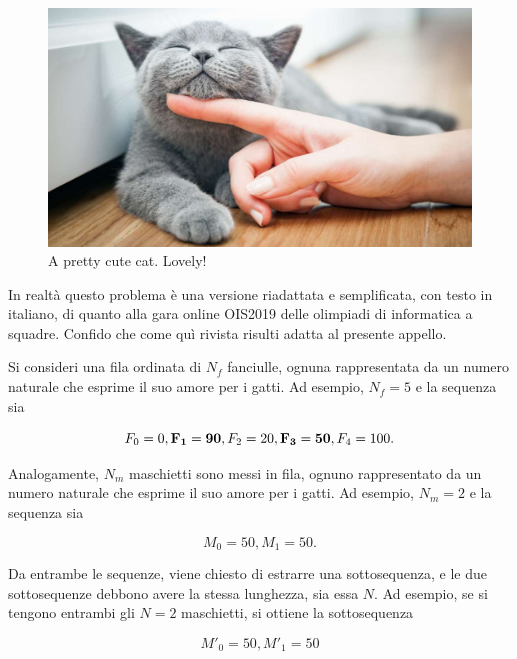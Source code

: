 \usepackage{xcolor}
\usepackage{afterpage}
\usepackage{pifont,mdframed}
\usepackage[bottom]{footmisc}

\makeatletter
\gdef\this@inputfilename{input}
\gdef\this@outputfilename{output}
\makeatother

\begin{figure}
  \vspace{-25pt}
  \begin{center}
        \includegraphics[width=0.9\linewidth]{cats.jpg}
  \end{center}
  \vspace{-20pt}
  \caption{A pretty cute cat. Lovely!}
\end{figure}

In realtà questo problema è una versione riadattata e semplificata, con testo in italiano, di quanto alla gara online OIS2019 delle olimpiadi di informatica a squadre. Confido che come quì rivista risulti adatta al presente appello.

Si consideri una fila ordinata di $N_f$ fanciulle, ognuna rappresentata da un numero naturale che esprime il suo amore per i gatti. Ad esempio, $N_f = 5$
e la sequenza sia

\[
   F_0 = 0, {\bf F_1 = 90}, F_2 = 20, {\bf F_3 = 50}, F_4=100.
\]

Analogamente, $N_m$ maschietti sono messi in fila, ognuno rappresentato da un numero naturale che esprime il suo amore per i gatti. Ad esempio, $N_m = 2$
e la sequenza sia

\[
   M_0 = 50, M_1=50.
\]

Da entrambe le sequenze, viene chiesto di estrarre una sottosequenza, e le due sottosequenze debbono avere la stessa lunghezza, sia essa $N$.
Ad esempio, se si tengono entrambi gli $N=2$ maschietti,
si ottiene la sottosequenza

\[
   M'_0 = 50, M'_1=50
\]


